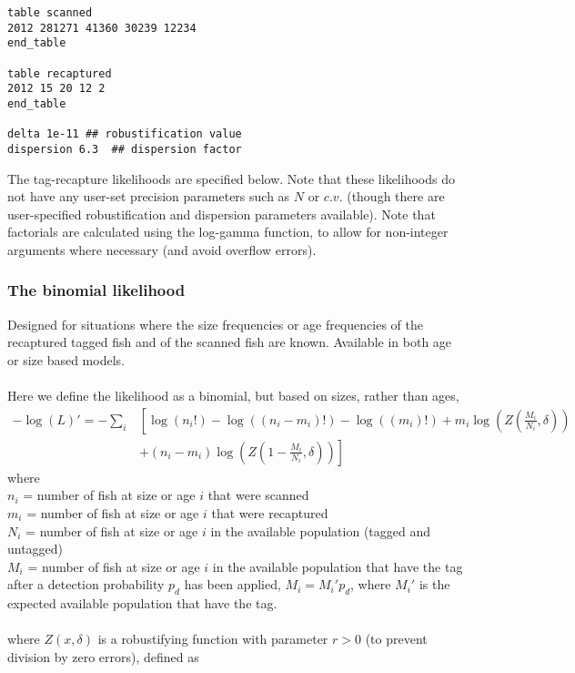 {{{{{{\begin{verbatim}
table scanned
2012 281271 41360 30239 12234
end_table

table recaptured
2012 15 20 12 2
end_table

delta 1e-11 ## robustification value
dispersion 6.3	## dispersion factor

\end{verbatim}}}



The tag-recapture likelihoods are specified below. Note that these likelihoods do not have any user-set precision parameters such as $N$ or $c.v.$ (though there are user-specified robustification and dispersion parameters available). Note that factorials are calculated using the log-gamma function, to allow for non-integer arguments where necessary (and avoid overflow errors).


\subsubsection*{The binomial likelihood}
Designed for situations where the size frequencies or age frequencies of the recaptured tagged fish and of the scanned fish are known. Available in both age or size based models.
\\\\
Here we define the likelihood as a binomial, but based on sizes, rather than ages,
\begin{equation}
\begin{split}
-\log \left(L \right)'= -\sum\limits_i & \left[ \right. \log \left(n_i! \right) - \log \left(\left(n_i - m_i \right)! \right) - \log \left(\left(m_i \right)! \right) + m_i \log \left(Z\left(\frac{M_i}{N_i},\delta \right) \right) \\
&+  \left(n_i - m_i \right)\log \left(Z\left(1 - \frac{M_i}{N_i},\delta\right) \right) \left. \right]
\end{split}
\end{equation}
where 
\\
$n_i$ = number of fish at size or age $i$ that were scanned
\\
$m_i$ = number of fish at size or age $i$ that were recaptured
\\
$N_i$ = number of fish at size or age $i$ in the available population (tagged and untagged)
\\
$M_i$ = number of fish at size or age $i$ in the available population that have the tag after a detection probability $p_d$ has been applied, $M_i = M_i'p_d$, where $M_i'$ is the expected available population that have the tag.
\\\\
where $Z(x,\delta)$ is a robustifying function with parameter $r > 0$ (to prevent division by zero errors), defined as


}}}}

